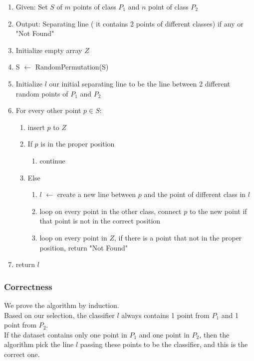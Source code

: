 \begin{enumerate}
\item Given: Set $S$ of $m$ points of class $P_1$ and $n$ point of class $P_2$  
\item Output: Separating line ( it contains 2 points of different classes) if any or "Not Found"

\item Initialize empty array $Z$
\item S $\leftarrow$ RandomPermutation(S) 
\item Initialize $l$ our initial separating line to be the line between 2 different random points of $P_1$ and $P_2$
\item For every other point  $p  \in S$:
\begin{enumerate}
    \item insert $p$ to $Z$
\item If $p$ is in the proper position
\begin{enumerate}
\item continue 
\end{enumerate}
\item Else  
   \begin{enumerate}
\item $l$  $\leftarrow$ create a new line between $p$ and the point of different class in $l$ 
\item loop on every point in the other class, connect $p$ to the new point if that point is not in the correct position
\item loop on every point in $Z$, if there is a point that not in the proper position, return "Not Found"

\end{enumerate}    
        
\end{enumerate}

\item return $l$
\end{enumerate}

\subsubsection*{Correctness}
We prove the algorithm by induction. \\ 

Based on our selection, the classifier $l$ always contains 1 point from $P_1$ and 1 point from $P_2$. \\

If the dataset contains only one point in $P_1$ and one point in $P_2$, then the algorithm pick the line $l$ passing these points to be the classifier, and this is the correct one. \\


